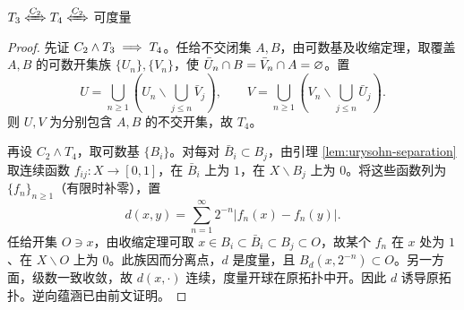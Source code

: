 \begin{theorem}\label{thm:urysohn-metrization}
    $T_3\xLeftrightarrow{C_2} T_4\xLeftrightarrow{C_2}$ 可度量
\end{theorem}
\begin{proof}
    先证 $C_2\land T_3\implies T_4$。任给不交闭集 $A,B$，由可数基及收缩定理，取覆盖 $A,B$ 的可数开集族 $\{U_n\},\{V_n\}$，使 $\bar U_n\cap B=\bar V_n\cap A=\varnothing$。置
    \[
        U=\bigcup_{n\geqslant1}\left(U_n\backslash\bigcup_{j\leqslant n}\bar V_j\right),\qquad
        V=\bigcup_{n\geqslant1}\left(V_n\backslash\bigcup_{j\leqslant n}\bar U_j\right).
    \]
    则 $U,V$ 为分别包含 $A,B$ 的不交开集，故 $T_4$。

    再设 $C_2\land T_4$，取可数基 $\{B_i\}$。对每对 $\bar B_i\subset B_j$，由引理 \ref{lem:urysohn-separation} 取连续函数 $f_{ij}:X\to[0,1]$，在 $\bar B_i$ 上为 $1$，在 $X\backslash B_j$ 上为 $0$。将这些函数列为 $\{f_n\}_{n\geqslant1}$（有限时补零），置
    \[
        d(x,y)=\sum_{n=1}^\infty2^{-n}|f_n(x)-f_n(y)|.
    \]
    任给开集 $O\ni x$，由收缩定理可取 $x\in B_i\subset\bar B_i\subset B_j\subset O$，故某个 $f_n$ 在 $x$ 处为 $1$、在 $X\backslash O$ 上为 $0$。此族因而分离点，$d$ 是度量，且 $B_d(x,2^{-n})\subset O$。另一方面，级数一致收敛，故 $d(x,\cdot)$ 连续，度量开球在原拓扑中开。因此 $d$ 诱导原拓扑。逆向蕴涵已由前文证明。
\end{proof}

